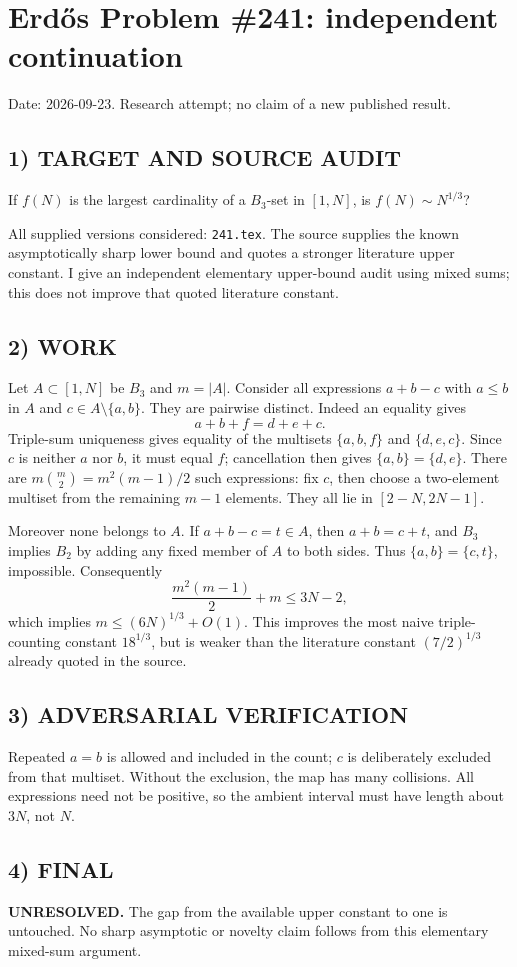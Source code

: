 \section{Erd\H{o}s Problem \#241: independent continuation}
\noindent Date: 2026-09-23. Research attempt; no claim of a new published result.
\subsection{1) TARGET AND SOURCE AUDIT}
If $f(N)$ is the largest cardinality of a $B_3$-set in $[1,N]$, is $f(N)\sim N^{1/3}$?

All supplied versions considered: \texttt{241.tex}.
The source supplies the known asymptotically sharp lower bound and quotes a stronger literature upper constant. I give an independent elementary upper-bound audit using mixed sums; this does not improve that quoted literature constant.
\subsection{2) WORK}
Let $A\subset[1,N]$ be $B_3$ and $m=|A|$. Consider all expressions $a+b-c$ with $a\le b$ in $A$ and $c\in A\setminus\{a,b\}$. They are pairwise distinct. Indeed an equality gives
\[
a+b+f=d+e+c.
\]
Triple-sum uniqueness gives equality of the multisets $\{a,b,f\}$ and $\{d,e,c\}$. Since $c$ is neither $a$ nor $b$, it must equal $f$; cancellation then gives $\{a,b\}=\{d,e\}$.
There are $m\binom m2=m^2(m-1)/2$ such expressions: fix $c$, then choose a two-element multiset from the remaining $m-1$ elements. They all lie in $[2-N,2N-1]$.

Moreover none belongs to $A$. If $a+b-c=t\in A$, then $a+b=c+t$, and $B_3$ implies $B_2$ by adding any fixed member of $A$ to both sides. Thus $\{a,b\}=\{c,t\}$, impossible. Consequently
\[
\frac{m^2(m-1)}2+m\le3N-2,
\]
which implies $m\le(6N)^{1/3}+O(1)$. This improves the most naive triple-counting constant $18^{1/3}$, but is weaker than the literature constant $(7/2)^{1/3}$ already quoted in the source.
\subsection{3) ADVERSARIAL VERIFICATION}
Repeated $a=b$ is allowed and included in the count; $c$ is deliberately excluded from that multiset. Without the exclusion, the map has many collisions. All expressions need not be positive, so the ambient interval must have length about $3N$, not $N$.
\subsection{4) FINAL}
\textbf{UNRESOLVED.}
The gap from the available upper constant to one is untouched. No sharp asymptotic or novelty claim follows from this elementary mixed-sum argument.
